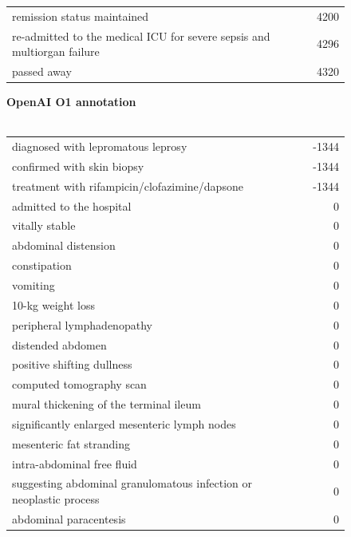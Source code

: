 \begin{figure}[!htbp]
\begin{minipage}[!htbp]{0.49\textwidth}
\begin{tabular}{P{0.75\textwidth}r}
            remission status maintained & 4200 \\
            re-admitted to the medical ICU for severe sepsis and multiorgan failure & 4296 \\
            passed away & 4320 \\
        \end{tabular}
    \end{minipage}
    \begin{minipage}[!htbp]{0.49\textwidth}
    \footnotesize
        \textbf{OpenAI O1 annotation} \\ \\
        \footnotesize
        \begin{tabular}{P{0.75\textwidth}r}
            diagnosed with lepromatous leprosy & -1344 \\  
            confirmed with skin biopsy & -1344 \\  
            treatment with rifampicin/clofazimine/dapsone & -1344 \\  
            admitted to the hospital & 0 \\ 
            vitally stable & 0 \\
            abdominal distension & 0 \\  
            constipation & 0 \\  
            vomiting & 0 \\ 
            10-kg weight loss & 0 \\   
            peripheral lymphadenopathy & 0 \\  
            distended abdomen & 0 \\  
            positive shifting dullness & 0 \\  
            computed tomography scan & 0 \\  
            mural thickening of the terminal ileum & 0 \\  
            significantly enlarged mesenteric lymph nodes & 0 \\  
            mesenteric fat stranding & 0 \\  
            intra-abdominal free fluid & 0 \\  
            suggesting abdominal granulomatous infection or neoplastic process & 0 \\  
            abdominal paracentesis & 0 \\ 

\end{tabular}
\end{minipage}
\end{figure}
